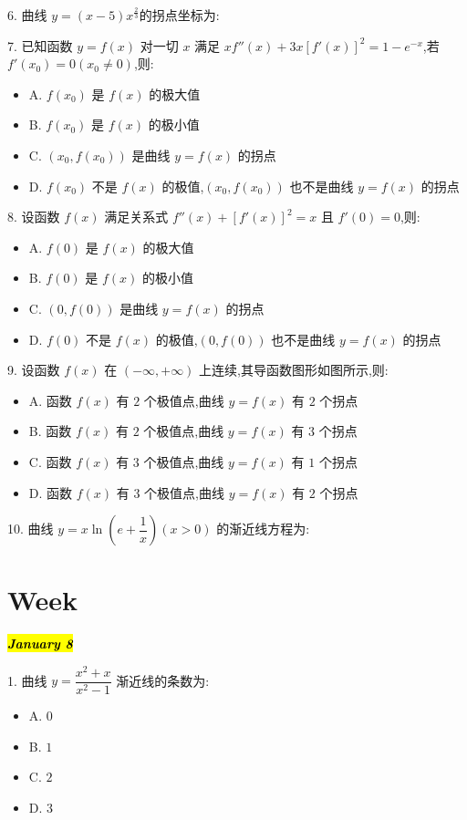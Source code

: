 6. 曲线 $y=(x-5)x^{\frac{2}{3}}$的拐点坐标为:

7. 已知函数 $y=f(x)$ 对一切 $x$ 满足 $xf''(x)+3x[f'(x)]^{2}=1-e^{-x}$,若 $f'(x_{0})=0(x_{0}\neq 0)$,则:
\begin{itemize}
	\item A. $f(x_{0})$ 是 $f(x)$ 的极大值
	\item B. $f(x_{0})$ 是 $f(x)$ 的极小值
	\item C. $(x_{0},f(x_{0}))$ 是曲线 $y=f(x)$ 的拐点
	\item D. $f(x_{0})$ 不是 $f(x)$ 的极值,$(x_{0},f(x_{0}))$ 也不是曲线 $y=f(x)$ 的拐点
\end{itemize}

8. 设函数 $f(x)$ 满足关系式 $f''(x)+[f'(x)]^{2}=x$ 且 $f'(0)=0$,则:
\begin{itemize}
	\item A. $f(0)$ 是 $f(x)$ 的极大值
	\item B. $f(0)$ 是 $f(x)$ 的极小值
	\item C. $(0,f(0))$ 是曲线 $y=f(x)$ 的拐点
	\item D. $f(0)$ 不是 $f(x)$ 的极值,$(0,f(0))$ 也不是曲线 $y=f(x)$ 的拐点
\end{itemize}

9. 设函数 $f(x)$ 在 $(-\infty,+\infty)$ 上连续,其导函数图形如图所示,则:
\begin{itemize}
	\item A. 函数 $f(x)$ 有 $2$ 个极值点,曲线 $y=f(x)$ 有 $2$ 个拐点
	\item B. 函数 $f(x)$ 有 $2$ 个极值点,曲线 $y=f(x)$ 有 $3$ 个拐点
	\item C. 函数 $f(x)$ 有 $3$ 个极值点,曲线 $y=f(x)$ 有 $1$ 个拐点
	\item D. 函数 $f(x)$ 有 $3$ 个极值点,曲线 $y=f(x)$ 有 $2$ 个拐点
\end{itemize}

10. 曲线 $y=x\ln\left( e+\dfrac{1}{x}\right)(x>0) $ 的渐近线方程为:

\section{Week }
\hl{\textbf{\textit{January 8}}}

1. 曲线 $y=\dfrac{x^{2}+x}{x^{2}-1}$ 渐近线的条数为:
\begin{itemize}
	\item A. $0$
	\item B. $1$
	\item C. $2$
	\item D. $3$
\end{itemize}

